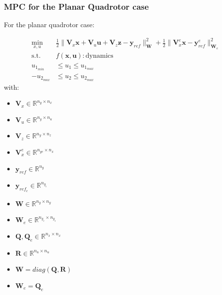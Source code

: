 \documentclass{thesisbeamer}
\begin{document}
\begin{frame}
	\frametitle{MPC for the Planar Quadrotor case}
	
	For the planar quadrotor case:
	
	\begin{equation}\label{mpc_optimization_problem_planar_quadrotor}
\begin{aligned}
            \min_{x,u} \quad & \frac{1}{2}\|\bm{V}_x \bm{x} + \bm{V}_u \bm{u} + \bm{V}_z \bm{z} - \bm{y}_{ref}\|^2_{\bm{W}} + \frac{1}{2}\|\bm{V}_x^e \bm{x} - \bm{y}_{ref}^e \|^2_{\bm{W}_e} \\
            \textrm{s.t.} \quad & f(\bm{x},\bm{u}):\text{dynamics} \\
             u_{1_{min}} &\leq u_1 \leq u_{1_{max}} \\
             - u_{2_{max}} &\leq u_2 \leq u_{2_{max}}
        \end{aligned}
\end{equation}
with: 
\begin{multicols}{3}
\begin{itemize}
	\item $\bm{V}_x \in \mathbb{R}^{n_y \times n_x}$
	\item $\bm{V}_u \in \mathbb{R}^{n_y \times n_u}$ 
	\item $\bm{V}_z \in \mathbb{R}^{n_y \times n_z}$
	\item $\bm{V}_x^e \in \mathbb{R}^{n_{ye}\times n_x}$
\end{itemize}
\columnbreak
\begin{itemize}
	\item $\bm{y}_{ref} \in \mathbb{R}^{n_y}$
	\item $\bm{y}_{ref_e} \in \mathbb{R}^{n_{y_e}}$
	\item $\bm{W} \in \mathbb{R}^{n_y \times n_y}$
	\item $\bm{W}_e \in \mathbb{R}^{n_{y_e} \times n_{y_e}}$
\end{itemize}
\columnbreak
\begin{itemize}
	\item $\bm{Q},\bm{Q}_e \in \mathbb{R}^{n_x \times n_x}$
	\item $\bm{R} \in \mathbb{R}^{n_u \times n_u}$
	\item $\bm{W} = diag(\bm{Q},\bm{R}) $
	\item $\bm{W}_e = \bm{Q}_e $
\end{itemize}
\end{multicols}
\end{frame}
\end{document}
